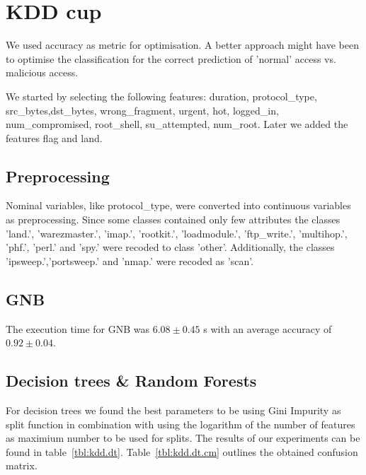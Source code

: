 \section{KDD cup}
We used accuracy as metric for optimisation. A better approach might have been to optimise the classification for the correct prediction of 'normal' access vs. malicious access. 

We started by selecting the following features: duration, protocol\_type, src\_bytes,dst\_bytes,
               wrong\_fragment,
               urgent,
               hot,
               logged\_in,
               num\_compromised,
               root\_shell,
               su\_attempted,
               num\_root.
Later we added the features flag and land. 

\subsection{Preprocessing}
Nominal variables, like protocol\_type, were converted into continuous variables as preprocessing. 
Since some classes contained only few attributes the classes 'land.', 'warezmaster.', 'imap.', 'rootkit.', 'loadmodule.', 'ftp\_write.', 'multihop.', 'phf.', 'perl.' and 'spy.' were recoded to class 'other'.
Additionally, the classes 'ipsweep.','portsweep.' and 'nmap.' were recoded as 'scan'. 

\subsection{GNB}
The execution time for GNB was $6.08 \pm 0.45$ s with an average accuracy of $0.92 \pm 0.04$.

\subsection{Decision trees \& Random Forests}
For decision trees we found the best parameters to be using Gini Impurity as split function in combination with using the logarithm of the number of features as maximium number to be used for splits. 
The results of our experiments can be found in table~\ref{tbl:kdd.dt}.
Table~\ref{tbl:kdd.dt.cm} outlines the obtained confusion matrix. 


